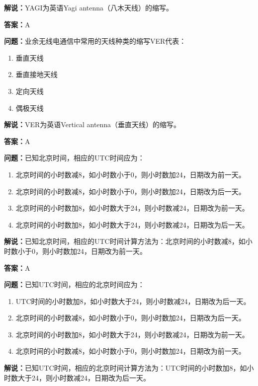 \textbf{解说：}YAGI为英语Yagi antenna（八木天线）的缩写。

\textbf{答案：}A

\textbf{问题：}业余无线电通信中常用的天线种类的缩写VER代表：

\begin{enumerate}[label=\Alph*), leftmargin=3em]
	\item 垂直天线
	\item 垂直接地天线
	\item 定向天线
	\item 偶极天线
\end{enumerate}

\textbf{解说：}VER为英语Vertical antenna（垂直天线）的缩写。

\textbf{答案：}A

\textbf{问题：}已知北京时间，相应的UTC时间应为：

\begin{enumerate}[label=\Alph*), leftmargin=3em]
	\item 北京时间的小时数减8，如小时数小于0，则小时数加24，日期改为前一天。
	\item 北京时间的小时数减8，如小时数小于0，则小时数加24，日期改为后一天。
	\item 北京时间的小时数加8，如小时数大于24，则小时数减24，日期改为前一天。
	\item 北京时间的小时数加8，如小时数大于24，则小时数减24，日期改为后一天。
\end{enumerate}

\textbf{解说：}已知北京时间，相应的UTC时间计算方法为：北京时间的小时数减8，如小时数小于0，则小时数加24，日期改为前一天。

\textbf{答案：}A

\textbf{问题：}已知UTC时间，相应的北京时间应为：

\begin{enumerate}[label=\Alph*), leftmargin=3em]
	\item UTC时间的小时数加8，如小时数大于24，则小时数减24，日期改为后一天。
	\item 北京时间的小时数减8，如小时数小于0，则小时数加24，日期改为后一天。
	\item 北京时间的小时数加8，如小时数大于24，则小时数减24，日期改为前一天。
	\item 北京时间的小时数减8，如小时数小于0，则小时数加24，日期改为前一天。
\end{enumerate}

\textbf{解说：}已知UTC时间，相应的北京时间计算方法为：UTC时间的小时数加8，如小时数大于24，则小时数减24，日期改为后一天。

